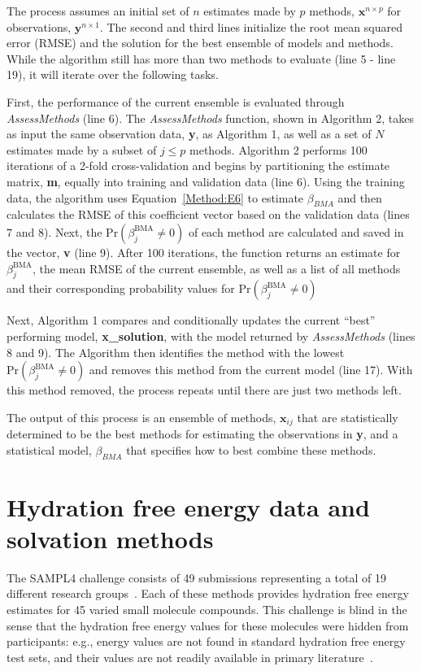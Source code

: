 \documentclass[12pt]{article}
\newcommand{\+}[1]{\ensuremath{\mathbf{#1}}}
\begin{document}
The process assumes an initial set of $n$ estimates made by $p$ methods, $\textbf{x}^{n \times p}$ for observations, $\textbf{y}^{n \times 1}$. The second and third lines initialize the root mean squared error (RMSE) and the solution for the best ensemble of models and methods. While the algorithm still has more than two methods to evaluate (line 5 - line 19), it will iterate over the following tasks. 

First, the performance of the current ensemble is evaluated through \emph{AssessMethods} (line 6). The \emph{AssessMethods} function, shown in Algorithm 2, takes as input the same observation data, \textbf{y}, as Algorithm 1, as well as a set of $N$ estimates made by a subset of $j \leq p$ methods. Algorithm 2 performs 100 iterations of a 2-fold cross-validation and begins by partitioning the estimate matrix, \textbf{m}, equally into training and validation data (line 6). Using the training data, the algorithm uses Equation~\ref{Method:E6} to estimate $\beta_{BMA}$ and then calculates the RMSE of this coefficient vector based on the validation data (lines 7 and 8). Next, the $\mathrm{Pr}(\beta_j^{\text{BMA}}\neq 0)$ of each method are calculated and saved in the vector, \textbf{v} (line 9). After 100 iterations, the function returns an estimate for $\beta_j^{\text{BMA}}$, the mean RMSE of the current ensemble, as well as a list of all methods and their corresponding probability values for $\mathrm{Pr}(\beta_j^{\text{BMA}}\neq 0)$

Next, Algorithm 1 compares and conditionally updates the current ``best'' performing model, \textbf{x\_solution}, with the model returned by \emph{AssessMethods} (lines 8 and 9).  The Algorithm then identifies the method with the lowest $\mathrm{Pr} (\beta_j^{\text{BMA}}\neq 0)$ and removes this method from the current model (line 17). With this method removed, the process repeats until there are just two methods left.

The output of this process is an ensemble of methods, $\textbf{x}_{ij}$ that are statistically determined to be the best methods for estimating the observations in \textbf{y}, and a statistical model, $\beta_{BMA}$ that specifies how to best combine these methods.  
 
\section{Hydration free energy data and solvation methods}
\label{EP:DataModels}
The SAMPL4 challenge consists of 49 submissions representing a total of 19 different research groups~\cite{Mobley:2014}. Each of these methods provides hydration free energy estimates for 45 varied small molecule compounds. This challenge is blind in the sense that the hydration free energy values for these molecules were hidden from participants: e.g., energy values are not found in standard hydration free energy test sets, and their values are not readily available in primary literature~\cite{Guthrie:2014}. 
\end{document}
